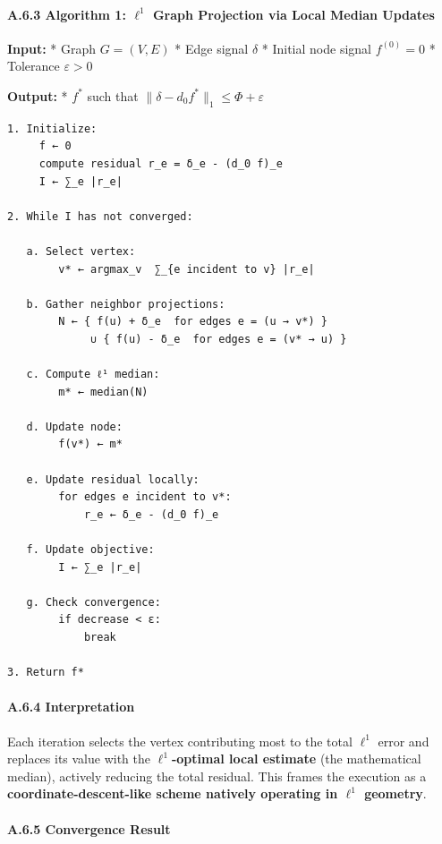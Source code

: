 \documentclass[
]{article}
\begin{document}
\paragraph{\texorpdfstring{A.6.3 Algorithm 1: \(\ell^1\) Graph
Projection via Local Median
Updates}{A.6.3 Algorithm 1: \textbackslash ell\^{}1 Graph Projection via Local Median Updates}}\label{a.6.3-algorithm-1-ell1-graph-projection-via-local-median-updates}

\textbf{Input:} * Graph \(G = (V,E)\) * Edge signal \(\delta\) * Initial
node signal \(f^{(0)} = 0\) * Tolerance \(\varepsilon > 0\)

\textbf{Output:} * \(f^*\) such that
\(\|\delta - d_0 f^*\|_1 \leq \Phi + \varepsilon\)

\begin{verbatim}
1. Initialize:
     f ← 0
     compute residual r_e = δ_e - (d_0 f)_e
     I ← ∑_e |r_e|

2. While I has not converged:

   a. Select vertex:
        v* ← argmax_v  ∑_{e incident to v} |r_e|

   b. Gather neighbor projections:
        N ← { f(u) + δ_e  for edges e = (u → v*) }
             ∪ { f(u) - δ_e  for edges e = (v* → u) }

   c. Compute ℓ¹ median:
        m* ← median(N)

   d. Update node:
        f(v*) ← m*

   e. Update residual locally:
        for edges e incident to v*:
            r_e ← δ_e - (d_0 f)_e

   f. Update objective:
        I ← ∑_e |r_e|

   g. Check convergence:
        if decrease < ε:
            break

3. Return f*
\end{verbatim}

\paragraph{A.6.4 Interpretation}\label{a.6.4-interpretation}

Each iteration selects the vertex contributing most to the total
\(\ell^1\) error and replaces its value with the
\textbf{\(\ell^1\)-optimal local estimate} (the mathematical median),
actively reducing the total residual. This frames the execution as a
\textbf{coordinate-descent-like scheme natively operating in \(\ell^1\)
geometry}.

\paragraph{A.6.5 Convergence Result}\label{a.6.5-convergence-result}
\end{document}
